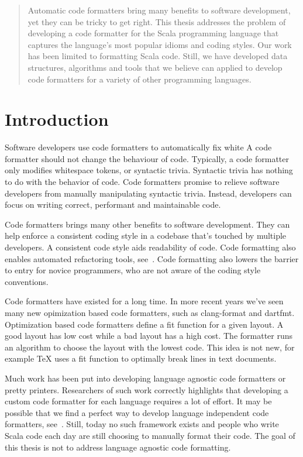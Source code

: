 \documentclass[11pt,a4paper]{article}
\begin{document}
  
\begin{abstract}
 Automatic code formatters bring many benefits to software development, yet they can be tricky to get right.
 This thesis addresses the problem of developing a code formatter for the Scala programming language that captures the language's most popular idioms and coding styles.
 Our work has been limited to formatting Scala code.
 Still, we have developed data structures, algorithms and tools that we believe can applied to develop code formatters for a variety of other programming languages.
\end{abstract}
\tableofcontents
% 
\section{Introduction}%
\label{sec:Introduction}
Software developers use code formatters to automatically fix white A code formatter should not change the behaviour of code.
Typically, a code formatter only modifies whitespace tokens, or syntactic trivia.
Syntactic trivia has nothing to do with the behavior of code.
Code formatters promise to relieve software developers from manually manipulating syntactic trivia.
Instead, developers can focus on writing correct, performant and maintainable code.

Code formatters brings many other benefits to software development.
They can help enforce a consistent coding style in a codebase that's touched by multiple developers.
A consistent code style aids readability of code.
Code formatting also enables automated refactoring tools, see~\autocite{wright_large-scale_2013}.
Code formatting also lowers the barrier to entry for novice programmers, who are not aware of the coding style conventions.

Code formatters have existed for a long time.
In more recent years we've seen many new opimization based code formatters, such as clang-format and dartfmt.
Optimization based code formatters define a fit function for a given layout.
A good layout has low cost while a bad layout has a high cost.
The formatter runs an algorithm to choose the layout with the lowest code.
This idea is not new, for example TeX uses a fit function to optimally break lines in text documents.

Much work has been put into developing language agnostic code formatters or pretty printers.
Researchers of such work correctly highlights that developing a custom code formatter for each language requires a lot of effort.
It may be possible that we find a perfect way to develop language independent code formatters, see~\autocite{mps_article}.
Still, today no such framework exists and people who write Scala code each day are still choosing to manually format their code.
The goal of this thesis is not to address language agnostic code formatting.
\end{document}
